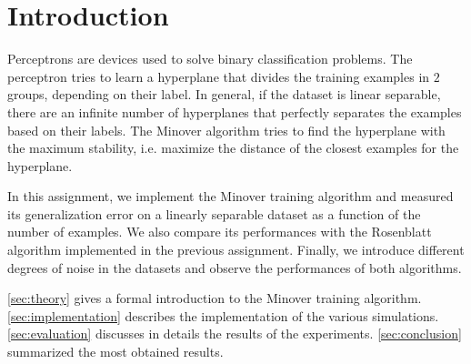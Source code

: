 \section{Introduction}
\label{sec:introduction}

Perceptrons are devices used to solve binary classification problems.
The perceptron tries to learn a hyperplane that divides the training examples in $2$ groups, depending on their label.
In general, if the dataset is linear separable, there are an infinite number of hyperplanes that perfectly separates the examples based on their labels.
The Minover algorithm tries to find the hyperplane with the maximum stability, i.e. maximize the distance of the closest examples for the hyperplane.

In this assignment, we implement the Minover training algorithm \cite{minover} and measured its generalization error on a linearly separable dataset as a function of the number of examples.
We also compare its performances with the Rosenblatt algorithm \cite{rosenblatt} implemented in the previous assignment.
Finally, we introduce different degrees of noise in the datasets and observe the performances of both algorithms.

\cref{sec:theory} gives a formal introduction to the Minover training algorithm.
\cref{sec:implementation} describes the implementation of the various simulations.
\cref{sec:evaluation} discusses in details the results of the experiments.
\cref{sec:conclusion} summarized the most obtained results.
